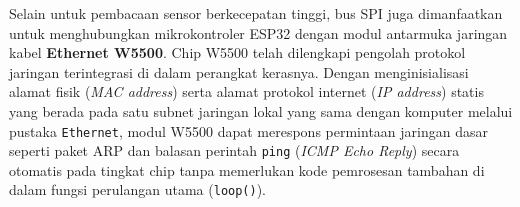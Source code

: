 Selain untuk pembacaan sensor berkecepatan tinggi, bus SPI juga dimanfaatkan untuk menghubungkan mikrokontroler ESP32 dengan modul antarmuka jaringan kabel \textbf{Ethernet W5500}. Chip W5500 telah dilengkapi pengolah protokol jaringan terintegrasi di dalam perangkat kerasnya. Dengan menginisialisasi alamat fisik (\textit{MAC address}) serta alamat protokol internet (\textit{IP address}) statis yang berada pada satu subnet jaringan lokal yang sama dengan komputer melalui pustaka \texttt{Ethernet}, modul W5500 dapat merespons permintaan jaringan dasar seperti paket ARP dan balasan perintah \texttt{ping} (\textit{ICMP Echo Reply}) secara otomatis pada tingkat chip tanpa memerlukan kode pemrosesan tambahan di dalam fungsi perulangan utama (\texttt{loop()}).

